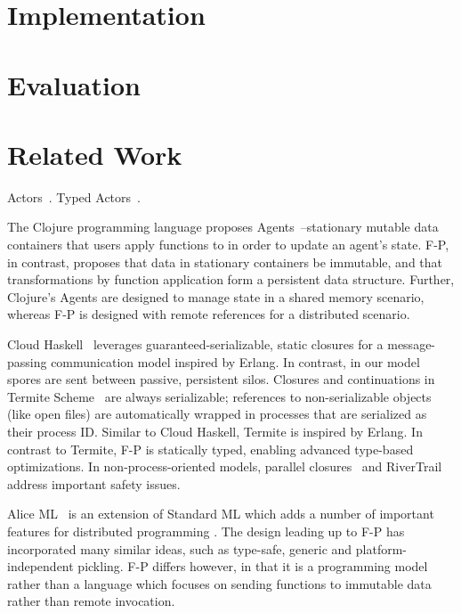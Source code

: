 \documentclass[preprint]{sigplanconf}
\theoremstyle{definition}
\theoremstyle{definition}
\begin{document}
\section{Implementation}
\label{sec:implementation}

\section{Evaluation}
\label{sec:evaluation}

\section{Related Work}
\label{sec:related-work}

Actors~\cite{Actors, ScalaActors}. Typed Actors~\cite{TypedActors}.

The Clojure programming language proposes Agents~\cite{Clojure}--stationary
mutable data containers that users apply functions to in order to update an
agent's state. F-P, in contrast, proposes that data in stationary containers
be immutable, and that transformations by function application form a
persistent data structure. Further, Clojure's Agents are designed to manage
state in a shared memory scenario, whereas F-P is designed with remote
references for a distributed scenario.

Cloud Haskell~\cite{CloudHaskell} leverages guaranteed-serializable, static
closures for a message-passing communication model inspired by Erlang. In
contrast, in our model spores are sent between passive, persistent silos.
Closures and continuations in Termite Scheme~\cite{TermiteScheme} are always
serializable; references to non-serializable objects (like open files) are
automatically wrapped in processes that are serialized as their process ID.
Similar to Cloud Haskell, Termite is inspired by Erlang. In contrast to
Termite, F-P is statically typed, enabling advanced type-based optimizations.
In non-process-oriented models, parallel closures~\cite{ParallelClosures} and
RiverTrail~\cite{RiverTrail} address important safety issues.

Alice ML~\cite{AliceML} is an extension of Standard ML which adds a number of
important features for distributed programming . The design
leading up to F-P has incorporated many similar ideas, such as {type-safe},
generic and platform-independent pickling. F-P differs however, in that it is
a programming model rather than a language which focuses on sending functions
to immutable data rather than remote invocation.
\end{document}
